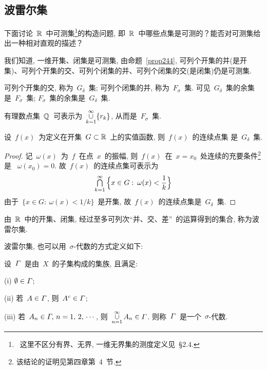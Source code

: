 \subsection{波雷尔集}

下面讨论~$\mathbb{R}$~中可测集\footnote{~这里不区分有界、无界, 一维无界集的测度定义见~\S2.4.}的构造问题, 即~$\mathbb{R}$~中哪些点集是可测的？能否对可测集给出一种相对直观的描述？

我们知道, 一维开集、闭集是可测集, 由命题~\ref{prop244}, 可列个开集的并(是开集)、可列个开集的交、可列个闭集的并、可列个闭集的交(是闭集)仍是可测集.

\begin{definition}
可列个开集的交, 称为~$G_\delta$~集; 可列个闭集的并,
称为~$F_\sigma$~集.
可见~$G_\delta$~集的余集是~$F_\sigma$~集; $F_\sigma$~集的余集是~$G_\delta$~集.
\end{definition}

\medskip

\begin{example}
有理数点集~$\mathbb{Q}$~可表示为~$\mathop{\cup}\limits_{k=1}^\infty \{r_k\}$,
从而是~$F_\sigma$~集.
\end{example}

\medskip

\begin{example}
设~$f(x)$~为定义在开集~$G \subset \mathbb{R}$~上的实值函数, 则~$f(x)$~的连续点集
是~$G_\delta$~集.
\end{example}

\medskip

\begin{proof}
记~$\omega(x)$~为~$f$~在点~$x$~的振幅, 则~$f(x)$~在~$x = x_0$~处连续的充要条件\footnote{该结论的证明见第四章第~4~节. }是
~$\omega(x_0) = 0$. 故~$f(x)$~的连续点集可表示为
\[
\mathop{\textstyle{\bigcap}}_{k=1}^\infty \Big\{ x \in G: \: \omega(x) < \frac{1}{k} \Big\}
\]
由于~$\{ x \in G: \: \omega(x) < 1/k \}$~是开集, 故~$f(x)$~的连续点集是~$G_\delta$~集.
\end{proof}

\begin{definition}
由~$\mathbb{R}$~中的开集、闭集, 经过至多可列次``并、交、差''~的运算得到的集合,
称为波雷尔集.
\end{definition}

波雷尔集, 也可以用~$\sigma$-代数的方式定义如下:


\begin{definition}
设~$\mathnormal{\Gamma}$~是由~$X$~的子集构成的集族, 且满足:

(i) $\emptyset \in {\mathnormal\Gamma}$;

(ii) 若~$A \in {\mathnormal\Gamma}$, 则~$A^c \in {\mathnormal\Gamma}$;

(iii) 若~$A_n \in {\mathnormal\Gamma}, \, n = 1,\,2,\,\cdots$, 则~$\mathop{\cup}
\limits_{n = 1}^\infty A_n \in {\mathnormal\Gamma}$.
则称~${\mathnormal\Gamma}$~是一个~$\sigma$-代数.
\end{definition}

